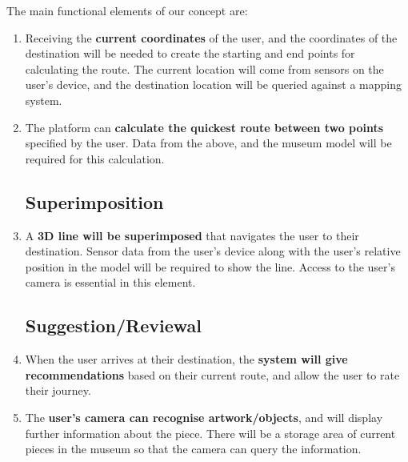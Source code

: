 
The main functional elements of our concept are:

\begin{enumerate}
\subsection*{Route Calculation}
    \item Receiving the \textbf{current coordinates} of the user, and the coordinates of the destination will be needed to create the starting and end points for calculating the route. The current location will come from sensors on the user's device, and the destination location will be queried against a mapping system.
    \item The platform can \textbf{calculate the quickest route between two points} specified by the user. Data from the above, and the museum model will be required for this calculation.

\subsection*{Superimposition}
    \item A \textbf{3D line will be superimposed} that navigates the user to their destination. Sensor data from the user's device along with the user's relative position in the model will be required to show the line. Access to the user's camera is essential in this element.

\subsection*{Suggestion/Reviewal}
    \item When the user arrives at their destination, the \textbf{system will give recommendations} based on their current route, and allow the user to rate their journey.
    \item The \textbf{user's camera can recognise artwork/objects}, and will display further information about the piece. There will be a storage area of current pieces in the museum so that the camera can query the information.
\end{enumerate}
